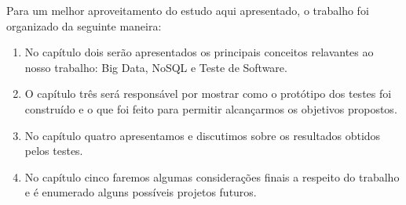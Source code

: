 Para um melhor aproveitamento do estudo aqui apresentado, o trabalho foi organizado da seguinte maneira:

\begin{enumerate}

\item No capítulo dois serão apresentados os principais conceitos relavantes ao nosso trabalho: Big Data, NoSQL e Teste de Software.

\item O capítulo três será responsável por mostrar como o protótipo dos testes foi construído e o que foi feito para permitir alcançarmos os objetivos propostos.

\item No capítulo quatro  apresentamos e discutimos sobre os resultados obtidos pelos testes.

\item No capítulo cinco faremos algumas considerações finais a respeito do trabalho e é enumerado alguns possíveis projetos futuros.

\end{enumerate}

